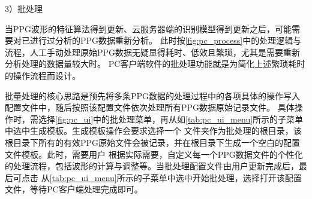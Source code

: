 3）批处理

当PPG波形的特征算法得到更新、云服务器端的识别模型得到更新之后，可能需要对已进行过分析的PPG数据重新分析。
此时按\autoref{fig:pc_process}中的处理逻辑与流程，人工手动处理原始PPG数据无疑显得耗时、低效且繁琐，尤其是需要重新分析处理的数据量较大时。
PC客户端软件的批处理功能就是为简化上述繁琐耗时的操作流程而设计。

批量处理的核心思路是预先将多条PPG数据的处理过程中的各项具体的操作写入配置文件中，随后按照该配置文件依次处理所有PPG数据原始记录文件。
具体操作时，需选择\autoref{fig:pc_ui}中的批处理菜单，再从如\autoref{tab:pc_ui_menu}所示的子菜单中选中生成模板。生成模板操作会要求选择一个
文件夹作为批处理的根目录，该根目录下所有的有效PPG原始文件会被记录，并在根目录下生成一个空白的配置文件模板。此时，需要用户
根据实际需要，自定义每一个PPG数据文件的个性化的处理流程，包括波形的计算与调整等。当批处理配置文件由用户更新完成后，最后可点击
从\autoref{tab:pc_ui_menu}所示的子菜单中选中开始批处理，选择打开该配置文件，等待PC客户端处理完成即可。

